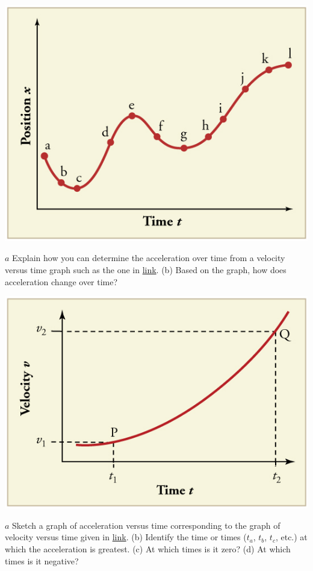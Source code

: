 \documentclass[
]{book}
\newenvironment{conceptual-questions}{}{}
\begin{document}
\begin{conceptual-questions}
\includegraphics{images/Figure_03_08Sol_02.jpg}

\hypertarget{fs-id1549493}{}
\leavevmode\hypertarget{fs-id1549495}{}%
\(a\) Explain how you can determine the acceleration over time from a
velocity versus time graph such as the one in
\protect\hyperlink{import-auto-id1778975}{link}. (b) Based on the
graph, how does acceleration change over time?

\includegraphics{images/Figure_03_08Sol_04.jpg}

\hypertarget{fs-id4131202}{}
\leavevmode\hypertarget{fs-id2086598}{}%
\(a\) Sketch a graph of acceleration versus time corresponding to the
graph of velocity versus time given in
\protect\hyperlink{import-auto-id1447833}{link}. (b) Identify the
time or times (\(t_{a}\), \(t_{b}\), \(t_{c}\), etc.) at which the
acceleration is greatest. (c) At which times is it zero? (d) At which
times is it negative?


\end{conceptual-questions}
\end{document}
